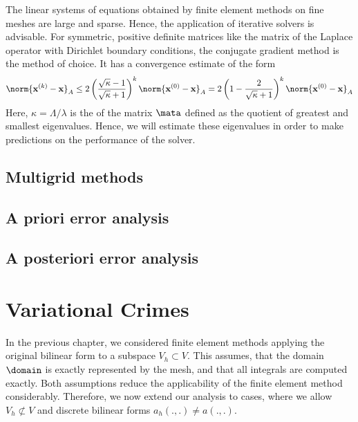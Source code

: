 \begin{intro}
  The linear systems of equations obtained by finite element methods
  on fine meshes are large and sparse. Hence, the application of
  iterative solvers is advisable. For symmetric, positive definite
  matrices like the matrix of the Laplace operator with Dirichlet
  boundary conditions, the conjugate gradient method is the method of
  choice. It has a convergence estimate of the form
  \begin{gather}
    \label{eq:cg:1}
    \norm{\vecx^{(k)} - \vecx}_A \le 2
    \left(\frac{\sqrt\kappa-1}{\sqrt\kappa+1}\right)^k \norm{\vecx^{(0)} - \vecx}_A
    =
    2\left(1-\frac{2}{\sqrt\kappa+1}\right)^k \norm{\vecx^{(0)} - \vecx}_A
  \end{gather}
  Here, $\kappa = \Lambda/\lambda$ is the  of the matrix $\mata$ defined as the quotient of greatest
  and smallest eigenvalues. Hence, we will estimate these eigenvalues
  in order to make predictions on the performance of the solver.
\end{intro}


\section{Multigrid methods}





\section{A priori error analysis}

\section{A posteriori error analysis}


\chapter{Variational Crimes}
\begin{intro}
  In the previous chapter, we considered finite element methods
  applying the original bilinear form to a subspace $V_h\subset
  V$. This assumes, that the domain $\domain$ is exactly represented
  by the mesh, and that all integrals are computed exactly. Both
  assumptions reduce the applicability of the finite element method
  considerably. Therefore, we now extend our analysis to cases, where
  we allow $V_h \not\subset V$ and discrete bilinear forms
  $a_h(.,.) \neq a(.,.)$.
\end{intro}

